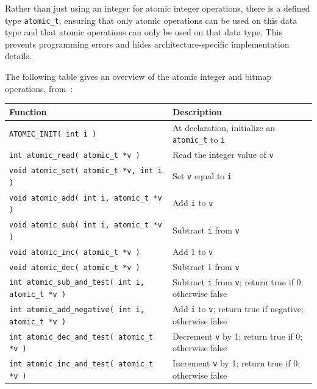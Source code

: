 Rather than just using an integer for atomic integer operations, there is a defined type \texttt{atomic\_t}, ensuring that only atomic operations can be used on this data type and that atomic operations can only be used on that data type. This prevents programming errors and hides architecture-specific implementation details.

The following table gives an overview of the atomic integer and bitmap operations, from~\cite{lkd}:

\begin{center}
\begin{tabular}{l|l}
	\textbf{Function} & \textbf{Description}\\\hline

	\texttt{ATOMIC\_INIT( int i )} & At declaration, initialize an \texttt{atomic\_t} to \texttt{i}\\\hline

\texttt{int atomic\_read( atomic\_t *v )} &  Read the integer value of \texttt{v}\\\hline

\texttt{void atomic\_set( atomic\_t *v, int i )} & Set \texttt{v} equal to \texttt{i}\\\hline

\texttt{void atomic\_add( int i, atomic\_t *v )} & Add \texttt{i} to \texttt{v}\\\hline

\texttt{void atomic\_sub( int i, atomic\_t *v )} & Subtract \texttt{i} from \texttt{v}\\\hline

\texttt{void atomic\_inc( atomic\_t *v )} & Add 1 to \texttt{v}\\\hline

\texttt{void atomic\_dec( atomic\_t *v )} & Subtract 1 from \texttt{v}\\\hline

\texttt{int atomic\_sub\_and\_test( int i, atomic\_t *v )} & Subtract \texttt{i} from \texttt{v}; return true if 0; otherwise false\\\hline

\texttt{int atomic\_add\_negative( int i, atomic\_t *v )} & Add \texttt{i} to \texttt{v}; return true if negative; otherwise false\\\hline

\texttt{int atomic\_dec\_and\_test( atomic\_t *v )} & Decrement \texttt{v} by 1; return true if 0; otherwise false\\\hline

\texttt{int atomic\_inc\_and\_test( atomic\_t *v )} & Increment \texttt{v} by 1; return true if 0; otherwise false\\ \hline\hline


\end{tabular}
\end{center}
